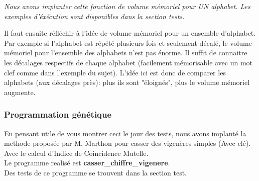 \documentclass[a4paper, 11pt]{article}
\begin{document}
\textit{Nous avons implanter cette fonction de volume mémoriel pour UN
alphabet. Les exemples d'éxécution sont disponibles dans la section
tests.\\}

Il faut ensuite réfléchir à l'idée de volume mémoriel pour un ensemble
d'alphabet.\\
Par exemple si l'alphabet est répété plusieurs fois et seulement
décalé, le volume mémoriel pour l'ensemble des alphabets n'est pas
énorme. Il suffit de connaitre les décalages respectifs de chaque
alphabet (facilement mémorisable avec un mot clef comme dans l'exemple
du sujet). L'idée ici est donc de comparer les alphabets (aux
décalages près): plus ils sont "éloignés", plus le volume mémoriel
augmente.


\subsubsection{Programmation génétique}
En pensant utile de vous montrer ceci le jour des tests, nous avons
implanté la methode proposée par M. Marthon pour casser des vigenères
simples (Avec clé). Avec le calcul d'Indice de Coincidence Mutelle. \\

Le programme realisé est \textbf{casser\_chiffre\_vigenere}.\\
Des tests de ce programme se trouvent dans la section test.\\
\end{document}
